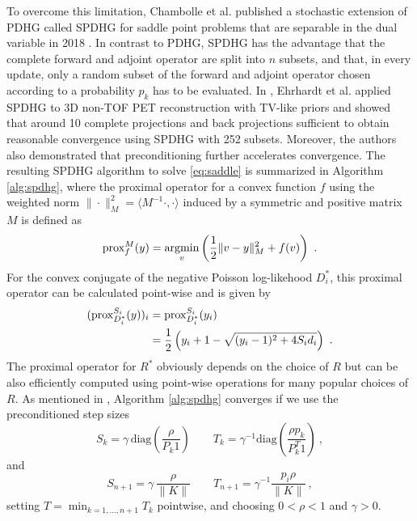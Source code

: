 To overcome this limitation, Chambolle et al. published a stochastic extension of PDHG called SPDHG 
for saddle point problems that are separable in the dual variable in 2018 \cite{Chambolle2018}.
In contrast to PDHG, SPDHG has the advantage that the complete forward and adjoint operator are
split into $n$ subsets, and that, in every update, only a random subset of the forward
and adjoint operator chosen according to a probability $p_k$ has to be evaluated.
In \cite{Ehrhardt2019}, Ehrhardt et al. applied SPDHG to 3D non-TOF PET reconstruction with TV-like
priors and showed that around 10 complete projections and back projections 
 sufficient 
to obtain reasonable convergence using SPDHG with 252 subsets.
Moreover, the authors also demonstrated that preconditioning further accelerates convergence.
The resulting SPDHG algorithm to solve \eqref{eq:saddle} is summarized in Algorithm \ref{alg:spdhg},
where the proximal operator for a convex function $f$ using the weighted norm 
$\| \cdot \|_M^2 = \langle M^{-1} \cdot, \cdot \rangle$ induced by a symmetric and 
positive matrix $M$ is defined as
%
\begin{equation}
\operatorname{prox}_{f}^{M}(y) = \operatorname*{argmin}_v \left( \frac{1}{2} \| v - y  \|_M^2 + f(v) \right) \ .
\end{equation}
%
For the convex conjugate of the negative Poisson log-likehood $D_i^*$, this proximal operator
can be calculated point-wise and is given by
%
\begin{equation}
\begin{split}
(\operatorname{prox}_{D_i^*}^{S_i}(y))_i &= \operatorname{prox}_{D_i^*}^{S_i}(y_i) \\ 
&= \frac{1}{2} \left(y_i + 1 - \sqrt{ (y_i-1)^2 + 4 S_i d_i} \right) \ .
\end{split}
\label{eq:proxD}
\end{equation} 
%
The proximal operator for $R^*$ obviously depends on the choice of $R$ but can be also efficiently 
computed using point-wise operations for many popular choices of $R$.
As mentioned in \cite{Ehrhardt2019}, Algorithm \ref{alg:spdhg} converges if we use the preconditioned
step sizes
%
\[ S_k = \gamma \, \text{diag}(\frac{\rho}{P_k 1} )\qquad  T_k = \gamma^{-1} \text{diag}(\frac{\rho p_k}{P^T_k 1}) \ , \]
% 
and
%
\[ S_{n+1} = \gamma \, \frac{\rho}{\|K\|} \qquad T_{n+1} = \gamma^{-1} \frac{p_i\rho}{\|K\|} \ , \]
%
setting $T = \min_{k=1,\ldots,n+1} T_k$ pointwise, and choosing $0<\rho<1$ and $\gamma>0$.
%
